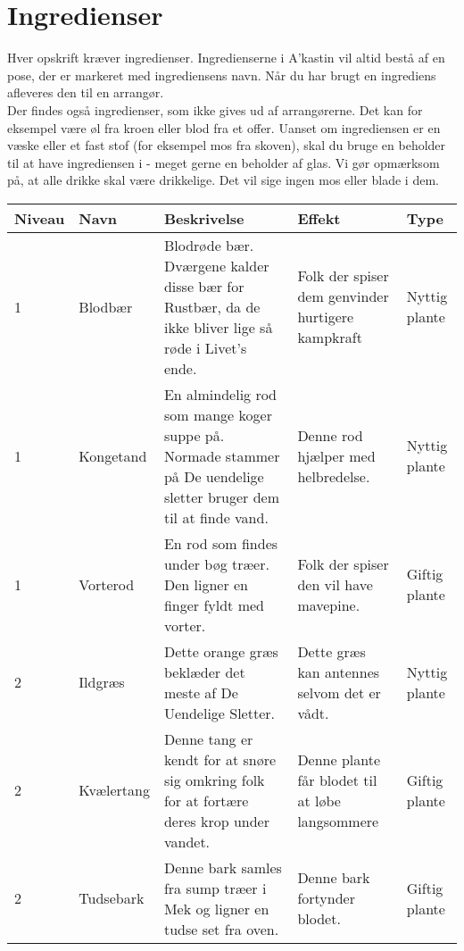 \chapter*{Ingredienser}
Hver opskrift kræver ingredienser. Ingredienserne i A'kastin vil altid bestå af en pose, der er markeret med ingrediensens navn. Når du har brugt en ingrediens afleveres den til en arrangør.\\
Der findes også ingredienser, som ikke gives ud af arrangørerne. Det kan for eksempel være øl fra kroen eller blod fra et offer. Uanset om ingrediensen er en væske eller et fast stof (for eksempel mos fra skoven), skal du bruge en beholder til at have ingrediensen i - meget gerne en beholder af glas. Vi gør opmærksom på, at alle drikke skal være drikkelige. Det vil sige ingen mos eller blade i dem.
\begin{center}
\begin{longtable}{|p{}|p{}|p{}|p{}|p{}|}
\hline
\rowcolor{cerulean!80}
Niveau & Navn & Beskrivelse & Effekt & Type \\\hline
\endhead

\hline \hline
\endlastfoot

1 & Blodbær &  Blodrøde bær. Dværgene kalder disse bær for Rustbær, da de ikke bliver lige så røde i Livet's ende. & Folk der spiser dem genvinder hurtigere kampkraft & Nyttig plante\\\hline
        
1 & Kongetand & En almindelig rod som mange koger suppe på. Normade stammer på De uendelige sletter bruger dem til at finde vand. & Denne rod hjælper med helbredelse. & Nyttig plante\\\hline

1 & Vorterod & En rod som findes under bøg træer. Den ligner en finger fyldt med vorter. & Folk der spiser den vil have mavepine. & Giftig plante \\\hline

2 & Ildgræs & Dette orange græs beklæder det meste af De Uendelige Sletter. & Dette græs kan antennes selvom det er vådt. & Nyttig plante \\\hline

2 & Kvælertang & Denne tang er kendt for at snøre sig omkring folk for at fortære deres krop under vandet. & Denne plante får blodet til at løbe langsommere & Giftig plante \\\hline

2 & Tudsebark & Denne bark samles fra sump træer i Mek og ligner en tudse set fra oven. & Denne bark fortynder blodet. & Giftig plante \\\hline


\end{longtable}
\end{center}
